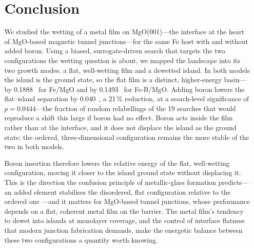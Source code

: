 \section{Conclusion}
\label{sec:conclusion}

We studied the wetting of a metal film on MgO(001)---the interface at the heart of MgO-based magnetic
tunnel junctions---for the same Fe host with and without added boron. Using a biased,
surrogate-driven search that targets the two configurations the wetting question is about, we mapped
the landscape into its two growth modes: a flat, well-wetting film and a dewetted island. In both
models the island is the ground state, so the flat film is a distinct, higher-energy basin---by
0.1888~\eVA{} for Fe/MgO and by 0.1493~\eVA{} for Fe-B/MgO. Adding boron lowers the flat--island
separation by 0.040~\eVA, a 21\,\% reduction, at a search-level significance of $p = 0.0444$---the
fraction of random relabellings of the 19 searches that would reproduce a shift this large if boron
had no effect. Boron acts inside the film rather than at the interface, and it does not displace the
island as the ground state: the ordered, three-dimensional configuration remains the more stable of
the two in both models.

Boron insertion therefore lowers the relative energy of the flat, well-wetting configuration, moving
it closer to the island ground state without displacing it. This is the direction the confusion
principle of metallic-glass formation predicts---an added element stabilises the disordered, flat
configuration relative to the ordered one \cite{greer1993}---and it matters for MgO-based tunnel
junctions, whose performance depends on a flat, coherent metal film on the barrier. The metal film's
tendency to dewet into islands at monolayer coverage, and the control of interface flatness that
modern junction fabrication demands, make the energetic balance between these two configurations a
quantity worth knowing.
